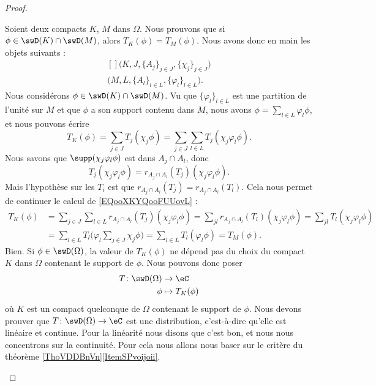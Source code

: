 \begin{proof}
\begin{subproof}
		\spitem[\( T_K=T_{K'}  \) sur les intersection]
		Soient deux compacts \( K\), \( M\) dans \( \Omega\). Nous prouvons que si \( \phi\in\swD(K)\cap\swD(M)\), alors \( T_{K}(\phi)=T_{M}(\phi)\). Nous avons donc en main les objets suivants :
		\begin{equation}
			\begin{aligned}[]
				\big( K, J, \{ A_j \}_{j\in J}, \{ \chi_j \}_{j\in J} \big) \\
				\big( M, L, \{ A_l \}_{l\in L}, \{ \varphi_l \}_{l\in L} \big).
			\end{aligned}
		\end{equation}
		Nous considérons \( \phi\in\swD(K)\cap\swD(M)\). Vu que \(\{ \varphi_l \}_{l\in L} \) est une partition de l'unité sur \( M\) et que \( \phi\) a son support contenu dans \( M\), nous avons \( \phi=\sum_{l\in L}\varphi_l\phi\), et nous pouvons écrire
		\begin{equation}        \label{EQooXKYQooFUUovL}
			T_K(\phi)=\sum_{j\in J}T_j(\chi_j\phi)=\sum_{j\in J}\sum_{l\in L}T_j(\chi_j\varphi_l\phi).
		\end{equation}
		Nous savons que \( \supp(\chi_j\varphi_l\phi)\) est dans \( A_j\cap A_l\), donc
		\begin{equation}
			T_j(\chi_j\varphi_l\phi)=r_{A_j\cap A_l}(T_j)(\chi_j\varphi_l\phi).
		\end{equation}
		Mais l'hypothèse sur les \( T_i\) est que \( r_{A_j\cap A_l}(T_j)=r_{A_j\cap A_l}(T_l)\). Cela nous permet de continuer le calcul de \eqref{EQooXKYQooFUUovL} :
		\begin{subequations}
			\begin{align}
				T_K(\phi) & =\sum_{j\in J}\sum_{l\in L}r_{A_j\cap A_l}(T_j)(\chi_j\varphi_l\phi)
				=\sum_{jl}r_{A_j\cap A_l}(T_l)(\chi_j\varphi_l\phi)
				=\sum_{jl}T_l(\chi_j\varphi_l\phi)                                               \\
				          & =\sum_{l\in L}T_l\big( \varphi_l\sum_{j\in J}\chi_j\phi \big)
				=\sum_{l\in L}T_l(\varphi_l\phi)
				=T_M(\phi).
			\end{align}
		\end{subequations}
		Bien.
		\spitem[Ce qu'on pose]
		Si \( \phi\in \swD(\Omega)\), la valeur de \( T_K(\phi)\) ne dépend pas du choix du compact \( K\) dans \( \Omega\) contenant le support de \( \phi\). Nous pouvons donc poser
		\begin{equation}
			\begin{aligned}
				T\colon \swD(\Omega) & \to \eC           \\
				\phi                 & \mapsto T_K(\phi)
			\end{aligned}
		\end{equation}
		où \( K\) est un compact quelconque de \( \Omega\) contenant le support de \( \phi\).
		Nous devons prouver que \( T\colon\swD(\Omega) \to \eC\) est une distribution, c'est-à-dire qu'elle est linéaire et continue. Pour la linéarité nous disons que c'est bon, et nous nous concentrons sur la continuité. Pour cela nous allons nous baser sur le critère du théorème \ref{ThoVDDBnVn}\ref{ItemSPvoijoii}.


\end{subproof}
\end{proof}
